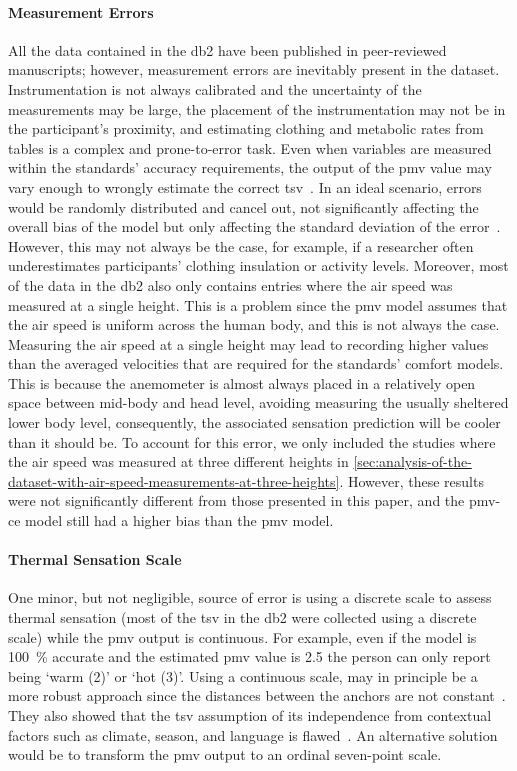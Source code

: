 \paragraph{Measurement Errors}
All the data contained in the \ac{db2} have been published in peer-reviewed manuscripts; however, measurement errors are inevitably present in the dataset.
Instrumentation is not always calibrated and the uncertainty of the measurements may be large, the placement of the instrumentation may not be in the participant's proximity, and estimating clothing and metabolic rates from tables is a complex and prone-to-error task.
Even when variables are measured within the standards' accuracy requirements, the output of the \ac{pmv} value may vary enough to wrongly estimate the correct \ac{tsv}~\cite{dambrosio_alfano_role_2011}.
In an ideal scenario, errors would be randomly distributed and cancel out, not significantly affecting the overall bias of the model but only affecting the standard deviation of the error~\cite{Humphreys2002}.
However, this may not always be the case, for example, if a researcher often underestimates participants' clothing insulation or activity levels.
Moreover, most of the data in the \ac{db2} also only contains entries where the air speed was measured at a single height.
This is a problem since the \ac{pmv} model assumes that the air speed is uniform across the human body, and this is not always the case.
Measuring the air speed at a single height may lead to recording higher values than the averaged velocities that are required for the standards’ comfort models.
This is because the anemometer is almost always placed in a relatively open space between mid-body and head level, avoiding measuring the usually sheltered lower body level, consequently, the associated sensation prediction will be cooler than it should be.
To account for this error, we only included the studies where the air speed was measured at three different heights in \ref{sec:analysis-of-the-dataset-with-air-speed-measurements-at-three-heights}.
However, these results were not significantly different from those presented in this paper, and the \ac{pmv-ce} model still had a higher bias than the \ac{pmv} model.

\paragraph{Thermal Sensation Scale}
One minor, but not negligible, source of error is using a discrete scale to assess thermal sensation (most of the \ac{tsv} in the \ac{db2} were collected using a discrete scale) while the \ac{pmv} output is continuous.
For example, even if the model is \qty{100}{\percent} accurate and the estimated \ac{pmv} value is \num{2.5} the person can only report being `warm (\num{2})' or `hot (\num{3})'.
Using a continuous scale, may in principle be a more robust approach since the distances between the anchors are not constant~\cite{schweiker2019scales, schweiker2020evaluating}.
They also showed that the \ac{tsv} assumption of its independence from contextual factors such as climate, season, and language is flawed~\cite{schweiker2019scales, schweiker2020evaluating}.
An alternative solution would be to transform the \ac{pmv} output to an ordinal seven-point scale.
